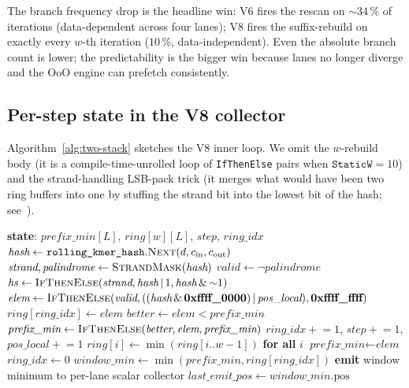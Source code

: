 The branch frequency drop is the headline win: V6 fires the rescan
on $\sim 34\,\%$ of iterations (data-dependent across four lanes);
V8 fires the suffix-rebuild on exactly every $w$-th iteration
($10\,\%$, data-independent).  Even the absolute branch count is
lower; the predictability is the bigger win because lanes no longer
diverge and the OoO engine can prefetch consistently.

\subsection{Per-step state in the V8 collector}

Algorithm~\ref{alg:two-stack} sketches the V8 inner loop. We omit
the $w$-rebuild body (it is a compile-time-unrolled loop of
\texttt{IfThenElse} pairs when $\texttt{StaticW}=10$) and the
strand-handling LSB-pack trick (it merges what would have been two
ring buffers into one by stuffing the strand bit into the lowest
bit of the hash; see~\cite[\S V4]{bioseq_eng_report_v2}).

\begin{algorithm}[H]
\caption{V8 \texttt{collect\_minimizers\_two\_stack\_simd} (per-step body)}
\label{alg:two-stack}
\small
\begin{algorithmic}[1]
\State \textbf{state}: $\textit{prefix\_min}[L]$, $\textit{ring}[w][L]$, $\textit{step}$, $\textit{ring\_idx}$
\State $\textit{hash} \gets \texttt{rolling\_kmer\_hash}.\textsc{Next}(d, c_\text{in}, c_\text{out})$
\State $\textit{strand}, \textit{palindrome} \gets \textsc{StrandMask}(\textit{hash})$
\State $\textit{valid} \gets \neg\textit{palindrome}$
\State $\textit{hs} \gets \textsc{IfThenElse}(\textit{strand}, \textit{hash}\,|\,1, \textit{hash}\,\&\,{\sim}1)$ 
\State $\textit{elem} \gets \textsc{IfThenElse}(\textit{valid}, ((\textit{hash}\,\&\,\textbf{0xffff\_0000})\,|\,\textit{pos\_local}), \textbf{0xffff\_ffff})$
\State $\textit{ring}[\textit{ring\_idx}] \gets \textit{elem}$ 
\State $\textit{better} \gets \textit{elem} < \textit{prefix\_min}$
\State $\textit{prefix\_min} \gets \textsc{IfThenElse}(\textit{better}, \textit{elem}, \textit{prefix\_min})$
\State $\textit{ring\_idx} \mathrel{+}= 1$, $\textit{step} \mathrel{+}= 1$, $\textit{pos\_local} \mathrel{+}= 1$
                                          
   \State $\textit{ring}[i] \gets \min(\textit{ring}[i..w-1])$ \textbf{for all} $i$ 
   \State $\textit{prefix\_min} \gets \textit{elem}$
   \State $\textit{ring\_idx} \gets 0$
\EndIf
\State $\textit{window\_min} \gets \min(\textit{prefix\_min}, \textit{ring}[\textit{ring\_idx}])$
   \State \textbf{emit} window minimum to per-lane scalar collector
   \State $\textit{last\_emit\_pos} \gets \textit{window\_min}.\text{pos}$
\EndIf
\end{algorithmic}
\end{algorithm}

